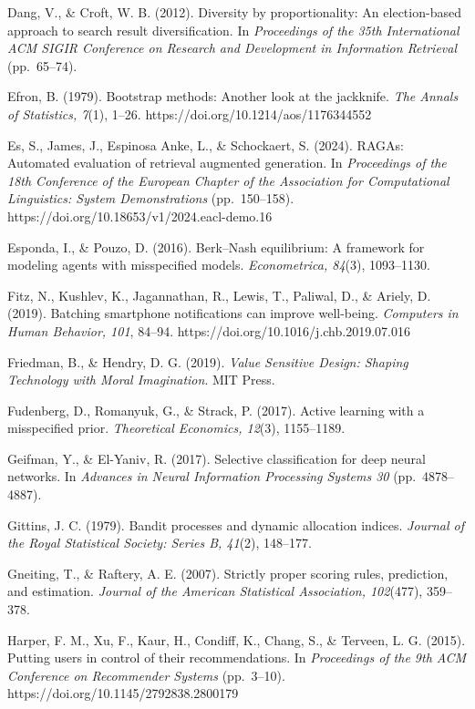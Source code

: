 \documentclass[
  11pt]{article}
\begin{document}
Dang, V., \& Croft, W. B. (2012). Diversity by proportionality: An
election-based approach to search result diversification. In
\emph{Proceedings of the 35th International ACM SIGIR Conference on
Research and Development in Information Retrieval} (pp.~65--74).

Efron, B. (1979). Bootstrap methods: Another look at the jackknife.
\emph{The Annals of Statistics, 7}(1), 1--26.
https://doi.org/10.1214/aos/1176344552

Es, S., James, J., Espinosa Anke, L., \& Schockaert, S. (2024). RAGAs:
Automated evaluation of retrieval augmented generation. In
\emph{Proceedings of the 18th Conference of the European Chapter of the
Association for Computational Linguistics: System Demonstrations}
(pp.~150--158). https://doi.org/10.18653/v1/2024.eacl-demo.16

Esponda, I., \& Pouzo, D. (2016). Berk--Nash equilibrium: A framework
for modeling agents with misspecified models. \emph{Econometrica,
84}(3), 1093--1130.

Fitz, N., Kushlev, K., Jagannathan, R., Lewis, T., Paliwal, D., \&
Ariely, D. (2019). Batching smartphone notifications can improve
well-being. \emph{Computers in Human Behavior, 101}, 84--94.
https://doi.org/10.1016/j.chb.2019.07.016

Friedman, B., \& Hendry, D. G. (2019). \emph{Value Sensitive Design:
Shaping Technology with Moral Imagination}. MIT Press.

Fudenberg, D., Romanyuk, G., \& Strack, P. (2017). Active learning with
a misspecified prior. \emph{Theoretical Economics, 12}(3), 1155--1189.

Geifman, Y., \& El-Yaniv, R. (2017). Selective classification for deep
neural networks. In \emph{Advances in Neural Information Processing
Systems 30} (pp.~4878--4887).

Gittins, J. C. (1979). Bandit processes and dynamic allocation indices.
\emph{Journal of the Royal Statistical Society: Series B, 41}(2),
148--177.

Gneiting, T., \& Raftery, A. E. (2007). Strictly proper scoring rules,
prediction, and estimation. \emph{Journal of the American Statistical
Association, 102}(477), 359--378.

Harper, F. M., Xu, F., Kaur, H., Condiff, K., Chang, S., \& Terveen, L.
G. (2015). Putting users in control of their recommendations. In
\emph{Proceedings of the 9th ACM Conference on Recommender Systems}
(pp.~3--10). https://doi.org/10.1145/2792838.2800179
\end{document}
